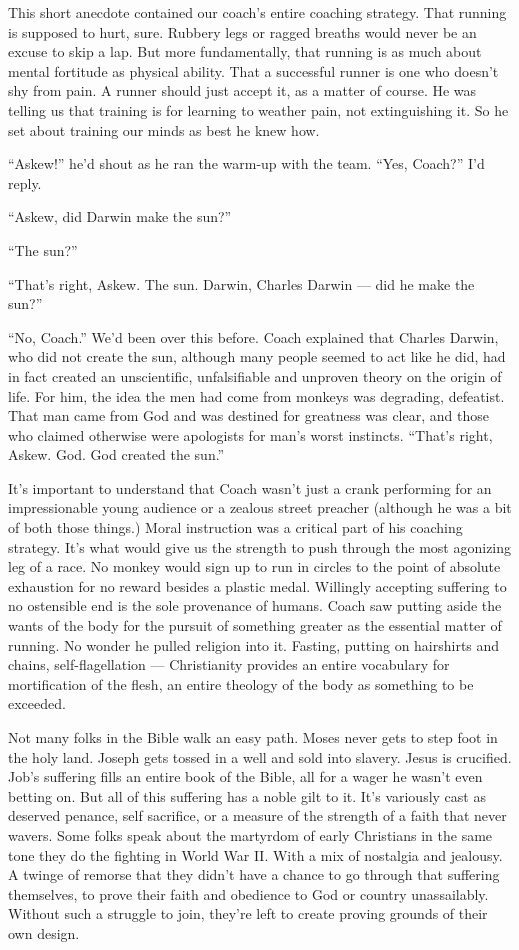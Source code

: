 \documentclass[12pt, oneside]{memoir}
\begin{document}
This short anecdote contained our coach's entire coaching strategy.
That running is supposed to hurt, sure.
Rubbery legs or ragged breaths would never be an excuse to skip a lap.
But more fundamentally, that running is as much about mental
fortitude as physical ability.
That a successful runner is one who doesn't shy from pain.
A runner should just accept it, as a matter of course.
He was telling us that training is for learning to weather pain, not
extinguishing it.
So he set about training our minds as best he knew how.

``Askew!'' he'd shout as he ran the warm-up with the team.
``Yes, Coach?'' I'd reply.

``Askew, did Darwin make the sun?''

``The sun?''

``That's right, Askew. The sun. Darwin, Charles Darwin --- did he make
the sun?''

``No, Coach.'' We'd been over this before.
Coach explained that Charles Darwin, who did not create the sun,
although many people seemed to act like he did, had in fact created an
unscientific, unfalsifiable and unproven theory on the origin of life.
For him, the idea the men had come from monkeys was degrading,
defeatist.
That man came from God and was destined for greatness was clear, and
those who claimed otherwise were apologists for man's worst instincts.
``That's right, Askew. God. God created the sun.''

It's important to understand that Coach wasn't just a crank performing
for an impressionable young audience or a zealous street preacher
(although he was a bit of both those things.)
Moral instruction was a critical part of his coaching strategy.
It's what would give us the strength to push through the most
agonizing leg of a race.
No monkey would sign up to run in circles to the point of absolute
exhaustion for no reward besides a plastic medal.
Willingly accepting suffering to no ostensible end is the sole
provenance of humans.
Coach saw putting aside the wants of the body for the pursuit of
something greater as the essential matter of running.
No wonder he pulled religion into it.
Fasting, putting on hairshirts and chains, self-flagellation ---
Christianity provides an entire vocabulary for mortification of the
flesh, an entire theology of the body as something to be exceeded.

Not many folks in the Bible walk an easy path.
Moses never gets to step foot in the holy land.
Joseph gets tossed in a well and sold into slavery.
Jesus is crucified.
Job's suffering fills an entire book of the Bible, all for a wager
he wasn't even betting on.
But all of this suffering has a noble gilt to it.
It's variously cast as deserved penance, self sacrifice, or a measure
of the strength of a faith that never wavers.
Some folks speak about the martyrdom of early Christians in the same
tone they do the fighting in World War II.
With a mix of nostalgia and jealousy.
A twinge of remorse that they didn't have a chance to go through that
suffering themselves, to prove their faith and obedience to God or
country unassailably.
Without such a struggle to join, they're left to create proving
grounds of their own design.
\end{document}

